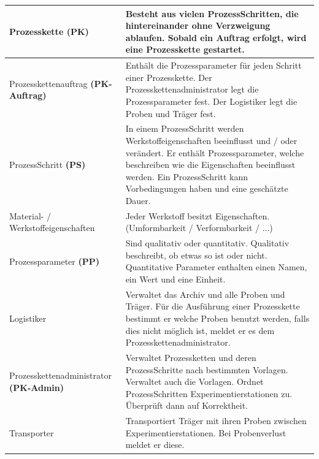 \documentclass[enabledeprecatedfontcommands,fontsize=12pt,paper=a4,twoside]{scrartcl}
\begin{document}
\begin{longtable}[c]{|p{7cm}|p{8cm}|}
Prozesskette \textbf{(PK)}                       & Besteht aus vielen ProzessSchritten, die hintereinander ohne Verzweigung ablaufen. Sobald ein Auftrag erfolgt, wird eine Prozesskette gestartet.                                                                                                        \\ \hline
Prozesskettenauftrag \textbf{(PK-Auftrag)}     & Enthält die Prozessparameter für jeden Schritt einer Prozesskette. Der Prozesskettenadministrator legt die Prozessparameter fest. Der Logistiker legt die Proben und Träger fest.                                                                     \\ \hline
ProzessSchritt \textbf{(PS)}                     & In einem ProzessSchritt werden Werkstoffeigenschaften beeinflusst und / oder verändert. Er enthält Prozessparameter, welche beschreiben wie die Eigenschaften beeinflusst werden. Ein ProzessSchritt kann Vorbedingungen haben und eine geschätzte Dauer. \\ \hline
Material- / Werkstoffeigenschaften                              & Jeder Werkstoff besitzt Eigenschaften. (Umformbarkeit / Verformbarkeit / ...)                                                                                                                                                                        \\ \hline
Prozessparameter \textbf{(PP)}                   & Sind qualitativ oder quantitativ. Qualitativ beschreibt, ob etwas so ist oder nicht. Quantitative Parameter enthalten einen Namen, ein Wert und eine Einheit.                                                                                          \\ \hline
Logistiker                                                      & Verwaltet das Archiv und alle Proben und Träger. Für die Ausführung einer Prozesskette bestimmt er welche Proben benutzt werden, falls dies nicht möglich ist, meldet er es dem Prozesskettenadministrator.                                           \\ \hline
Prozesskettenadministrator\textbf{ (PK-Admin)} & Verwaltet Prozessketten und deren ProzessSchritte nach bestimmten Vorlagen. Verwaltet auch die Vorlagen. Ordnet ProzessSchritten Experimentierstationen zu. Überprüft dann auf Korrektheit.                                                           \\ \hline
Transporter                                                     & Transportiert Träger mit ihren Proben zwischen Experimentierstationen. Bei Probenverlust meldet er diese.                                                                                                                                             \\ \hline

\end{longtable}
\end{document}
